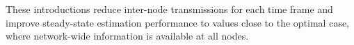 \documentclass{article}
\begin{document}
These introductions reduce inter-node transmissions for each time frame and improve steady-state estimation performance to values close to the optimal case, where network-wide information is available at all nodes.



\vfill\pagebreak



\end{document}
